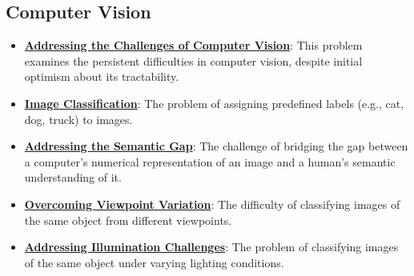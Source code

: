 \documentclass{article}%
\begin{document}
\subsection{Computer Vision}%
\label{subsec:ComputerVision}%
\begin{itemize}[leftmargin=*]%
\item \href{https://purdue.brightspace.com/d2l/common/assets/pdfjs-d2l-dist/1.0.14-legacy/web/viewer.html?file=\%2Fcontent\%2Fenforced\%2F1095467-wl.202510.CS.24300.001\%2F02L2-Intro.pdf\%3Fou\%3D1095467\&lang=en-us\&container=d2l-fileviewer-rendered-pdf\&fullscreen=d2l-fileviewer-rendered-pdf-dialog\&height=667#page=15}{\textbf{Addressing the Challenges of Computer Vision}}: This problem examines the persistent difficulties in computer vision, despite initial optimism about its tractability.%
\item \href{https://purdue.brightspace.com/d2l/common/assets/pdfjs-d2l-dist/1.0.14-legacy/web/viewer.html?file=\%2Fcontent\%2Fenforced\%2F1095467-wl.202510.CS.24300.001\%2F07L2-Vision.pdf\%3Fou\%3D1095467\&lang=en-us\&container=d2l-fileviewer-rendered-pdf\&fullscreen=d2l-fileviewer-rendered-pdf-dialog\&height=667#page=3}{\textbf{Image Classification}}: The problem of assigning predefined labels (e.g., cat, dog, truck) to images.%
\item \href{https://purdue.brightspace.com/d2l/common/assets/pdfjs-d2l-dist/1.0.14-legacy/web/viewer.html?file=\%2Fcontent\%2Fenforced\%2F1095467-wl.202510.CS.24300.001\%2F07L2-Vision.pdf\%3Fou\%3D1095467\&lang=en-us\&container=d2l-fileviewer-rendered-pdf\&fullscreen=d2l-fileviewer-rendered-pdf-dialog\&height=667#page=4}{\textbf{Addressing the Semantic Gap}}: The challenge of bridging the gap between a computer's numerical representation of an image and a human's semantic understanding of it.%
\item \href{https://purdue.brightspace.com/d2l/common/assets/pdfjs-d2l-dist/1.0.14-legacy/web/viewer.html?file=\%2Fcontent\%2Fenforced\%2F1095467-wl.202510.CS.24300.001\%2F07L2-Vision.pdf\%3Fou\%3D1095467\&lang=en-us\&container=d2l-fileviewer-rendered-pdf\&fullscreen=d2l-fileviewer-rendered-pdf-dialog\&height=667#page=6}{\textbf{Overcoming Viewpoint Variation}}: The difficulty of classifying images of the same object from different viewpoints.%
\item \href{https://purdue.brightspace.com/d2l/common/assets/pdfjs-d2l-dist/1.0.14-legacy/web/viewer.html?file=\%2Fcontent\%2Fenforced\%2F1095467-wl.202510.CS.24300.001\%2F07L2-Vision.pdf\%3Fou\%3D1095467\&lang=en-us\&container=d2l-fileviewer-rendered-pdf\&fullscreen=d2l-fileviewer-rendered-pdf-dialog\&height=667#page=7}{\textbf{Addressing Illumination Challenges}}: The problem of classifying images of the same object under varying lighting conditions.%

\end{itemize}
\end{document}
